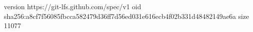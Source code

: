 version https://git-lfs.github.com/spec/v1
oid sha256:a8cf7f56085fbcca582479d36ff7d56ed031e616ecb4f02b331d48482149ae6a
size 11077
